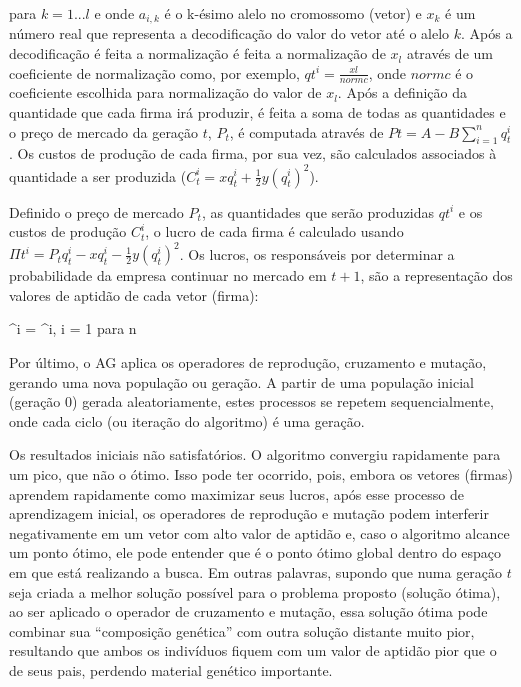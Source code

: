 para $k = 1...l$ e onde $a_{i,k}$ é o k-ésimo alelo no cromossomo (vetor) e $x_k$ é um número real que representa a decodificação do valor do vetor até o alelo $k$. Após a decodificação é feita a normalização é feita a normalização de $x_l$ através de um coeficiente de normalização como, por exemplo, $q{t}^i = \frac{xl}{normc}$, onde $normc$ é o coeficiente escolhida para normalização do valor de $x_l$. Após a definição da quantidade que cada firma irá produzir, é feita a soma de todas as quantidades e o preço de mercado da geração $t$, $P_t$, é computada através de $P{t} = A-B\sum^{n}_{i=1}{q_{t}^i}$. Os custos de produção de cada firma, por sua vez, são calculados associados à quantidade a ser produzida ($C_{t}^i = xq_{t}^i + \frac{1}{2}y(q_{t}^i)^2$).

Definido o preço de mercado $P_t$, as quantidades que serão produzidas $q{t}^i$ e os custos de produção $C_{t}^i$, o lucro de cada firma é calculado usando $\Pi{t}^i = P_{t}q_{t}^i - xq_{t}^i - \frac{1}{2}y(q_{t}^i)^2$. Os lucros, os responsáveis por determinar a probabilidade da empresa continuar no mercado em $t+1$, são a representação dos valores de aptidão de cada vetor (firma):

\equacao
	{^i = ^i, i = 1 para n}
	{}

Por último, o AG aplica os operadores de reprodução, cruzamento e mutação, gerando uma nova população ou geração. A partir de uma população inicial (geração 0) gerada aleatoriamente, estes processos se repetem sequencialmente, onde cada ciclo (ou iteração do algoritmo) é uma geração.

Os resultados iniciais não satisfatórios. O algoritmo convergiu rapidamente para um pico, que não o ótimo. Isso pode ter ocorrido, pois, embora os vetores (firmas) aprendem rapidamente como maximizar seus lucros, após esse processo de aprendizagem inicial, os operadores de reprodução e mutação podem interferir negativamente em um vetor com alto valor de aptidão e, caso o algoritmo alcance um ponto ótimo, ele pode entender que é o ponto ótimo global dentro do espaço em que está realizando a busca. Em outras palavras, supondo que numa geração $t$ seja criada a melhor solução possível para o problema proposto (solução ótima), ao ser aplicado o operador de cruzamento e mutação, essa solução ótima pode combinar sua \enquote{composição genética} com outra solução distante muito pior, resultando que ambos os indivíduos fiquem com um valor de aptidão pior que o de seus pais, perdendo material genético importante. 

